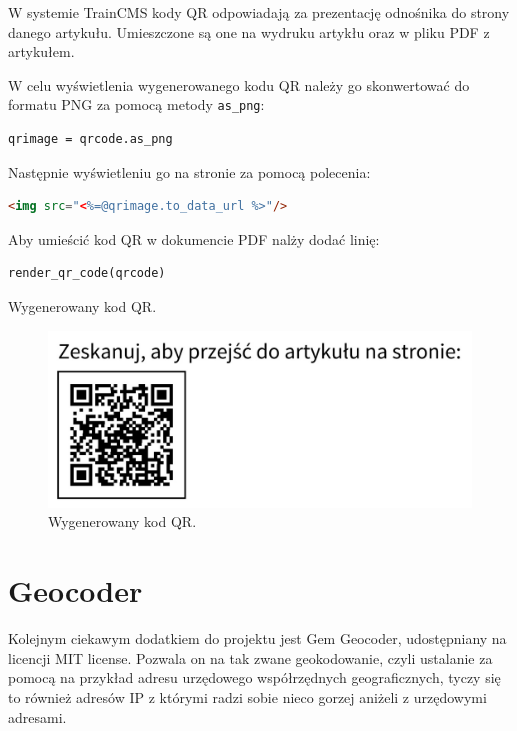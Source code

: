 \documentclass[openright]{xmgr}
\begin{document}
W systemie TrainCMS kody QR odpowiadają za prezentację odnośnika do strony danego artykułu. Umieszczone są one na wydruku artykłu oraz w pliku PDF z artykułem. 

W celu wyświetlenia wygenerowanego kodu QR należy go skonwertować do formatu PNG za pomocą metody \texttt{as\_png}:
\begin{lstlisting}[language=ruby2, caption={Kod konwertujący kod QR}]
qrimage = qrcode.as_png
\end{lstlisting}
Następnie wyświetleniu go na stronie za pomocą polecenia:
\begin{lstlisting}[language=html, caption={Kod wyświetlający kod QR na stronie HTML}]
<img src="<%=@qrimage.to_data_url %>"/>
\end{lstlisting}
Aby umieścić kod QR w dokumencie PDF nalży dodać linię:
\begin{lstlisting}[language=ruby2, caption={Kod wyświetlający kod QR w dokumencie PDF}]
render_qr_code(qrcode)
\end{lstlisting}

\newpage

Wygenerowany kod QR.
\begin{figure}[!tbh]
\centering
\includegraphics[width=.6\linewidth]{fig/kodqr}
\caption{Wygenerowany kod QR.}
\end{figure}

\section{Geocoder}
Kolejnym ciekawym dodatkiem do projektu jest Gem Geocoder\cite{geocoder}, udostępniany na licencji MIT license. Pozwala on na tak zwane geokodowanie, czyli ustalanie za pomocą na przykład adresu  urzędowego współrzędnych geograficznych, tyczy się to również adresów IP z którymi radzi sobie nieco gorzej aniżeli z urzędowymi adresami. 
\end{document}
